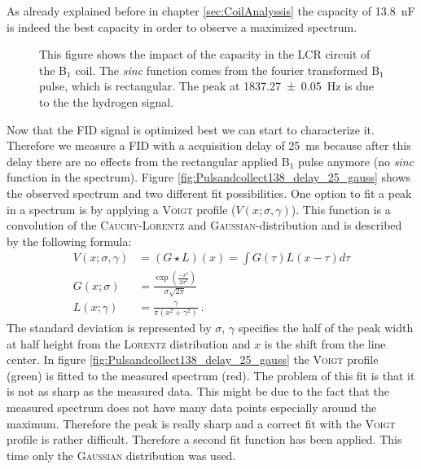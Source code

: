 As already explained before in chapter \ref{sec:CoilAnalyssis} the capacity of \SI{13.8}{\nano \farad} is indeed the best capacity in order to observe a maximized spectrum.
\begin{figure}[H]
    \centering
    
    \caption[This figure shows the impact of the capacity in the LCR circuit of the B$_1$ coil.]{This figure shows the impact of the capacity in the LCR circuit of the B$_1$ coil.
    The \textit{sinc} function comes from the fourier transformed B$_1$ pulse, which is rectangular.
    The peak at \SI{1837.27 \pm 0.05}{\hertz} is due to the the hydrogen signal.}
    \label{fig:Pulsandcollect}
\end{figure}
Now that the FID signal is optimized best we can start to characterize it.
Therefore we measure a FID with a acquisition delay of \SI{25}{\milli \second} because after this delay there are no effects from the rectangular applied B$_1$ pulse anymore (no \textit{sinc} function in the spectrum).
Figure \ref{fig:Pulsandcollect138_delay_25_gauss} shows the observed spectrum and two different fit possibilities.\newline
One option to fit a peak in a spectrum is by applying a \textsc{Voigt} profile ($V(x;\sigma , \gamma)$).
This function is a convolution of the \textsc{Cauchy-Lorentz} and \textsc{Gaussian}-distribution and is described by the following formula:
\begin{align}
    V(x;\sigma , \gamma) &= ( G \star L)(x) = \int G(\tau) L(x-\tau) d\tau \\
    G(x;\sigma) &= \frac{\exp\left(\frac{-x^2}{2\sigma^2}\right)}{\sigma \sqrt{2 \pi}} \\
    L(x;\gamma)  &= \frac{\gamma}{\pi \left( x^2+\gamma^2\right)} \ .
    \label{eq: voigt} 
\end{align}
The standard deviation is represented by $\sigma$, $\gamma$ specifies the half of the peak width at half height from the \textsc{Lorentz} distribution and $x$ is the shift from the line center.
In figure \ref{fig:Pulsandcollect138_delay_25_gauss} the \textsc{Voigt} profile (green) is fitted to the measured spectrum (red).
The problem of this fit is that it is not as sharp as the measured data.
This might be due to the fact that the measured spectrum does not have many data points especially around the maximum.
Therefore the peak is really sharp and a correct fit with the \textsc{Voigt} profile is rather difficult.
Therefore a second fit function has been applied.
This time only the \textsc{Gaussian} distribution was used.
